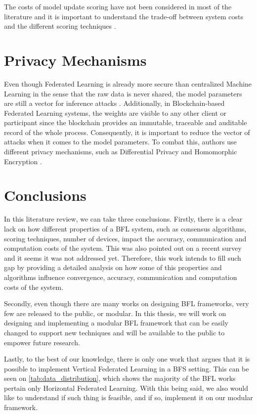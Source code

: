 The costs of model update scoring have not been considered in most of the literature and it is important to understand the trade-off between system costs and the different scoring techniques \cite{9403374, 10.48550/arxiv.2110.02182}.

\section{Privacy Mechanisms}\label{related_work:privacy}

Even though Federated Learning is already more secure than centralized Machine Learning in the sense that the raw data is never shared, the model parameters are still a vector for inference attacks \cite{10.1145/3298981}. Additionally, in Blockchain-based Federated Learning systems, the weights are visible to any other client or participant since the blockchain provides an immutable, traceable and auditable record of the whole process. Consequently, it is important to reduce the vector of attacks when it comes to the model parameters. To combat this, authors use different privacy mechanisms, such as Differential Privacy \cite{10.48550/arxiv.2007.03856, Peyvandi2022, 9170559} and Homomorphic Encryption \cite{8945913, 8894364}.

\section{Conclusions}\label{related_work:conclusions}

In this literature review, we can take three conclusions. Firstly, there is a clear lack on how different properties of a BFL system, such as consensus algorithms, scoring techniques, number of devices, impact the accuracy, communication and computation costs of the system. This was also pointed out on a recent survey \cite{9403374} and it seems it was not addressed yet. Therefore, this work intends to fill such gap by providing a detailed analysis on how some of this properties and algorithms influence convergence, accuracy, communication and computation costs of the system.

Secondly, even though there are many works on designing BFL frameworks, very few are released to the public, or modular. In this thesis, we will work on designing and implementing a modular BFL framework that can be easily changed to support new techniques and will be available to the public to empower future research.

Lastly, to the best of our knowledge, there is only one work that argues that it is possible to implement Vertical Federated Learning in a BFS setting. This can be seen on \autoref{tab:data_distribution}, which shows the majority of the BFL works pertain only Horizontal Federated Learning. With this being said, we also would like to understand if such thing is feasible, and if so, implement it on our modular framework.




